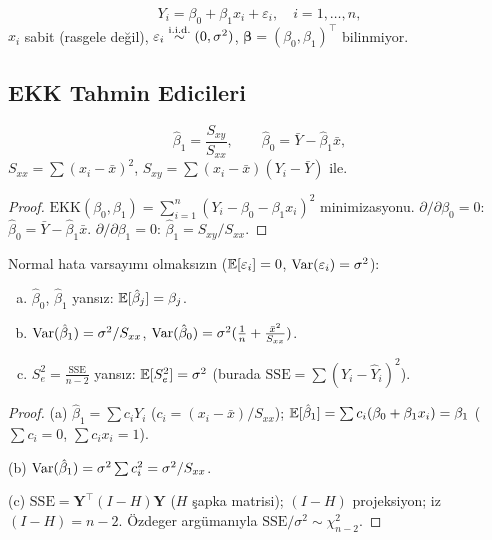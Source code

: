 \begin{tanim}\label{def:bdr_model}
\[
  Y_i = \beta_0 + \beta_1 x_i + \varepsilon_i, \quad i=1,\ldots,n,
\]
$x_i$ sabit (rasgele değil), $\varepsilon_i\overset{\text{i.i.d.}}{\sim}(0,\sigma^2)$, $\boldsymbol{\beta}=(\beta_0,\beta_1)^\top$ bilinmiyor.
\end{tanim}

\subsection{EKK Tahmin Edicileri}

\begin{teorem}\label{thm:ekk_tah}
\[
  \hat\beta_1 = \frac{S_{xy}}{S_{xx}}, \qquad \hat\beta_0 = \bar{Y} - \hat\beta_1\bar{x},
\]
$S_{xx}=\sum(x_i-\bar{x})^2$, $S_{xy}=\sum(x_i-\bar{x})(Y_i-\bar{Y})$ ile.
\end{teorem}

\begin{proof}
$\mathrm{EKK}(\beta_0,\beta_1) = \sum_{i=1}^n(Y_i-\beta_0-\beta_1 x_i)^2$ minimizasyonu. $\partial/\partial\beta_0=0$: $\hat\beta_0=\bar{Y}-\hat\beta_1\bar{x}$. $\partial/\partial\beta_1=0$: $\hat\beta_1=S_{xy}/S_{xx}$.
\end{proof}

\begin{teorem}\label{thm:ekk_ozell}
Normal hata varsayımı olmaksızın ($\mathbb{E}[\varepsilon_i]=0$, $\operatorname{Var}(\varepsilon_i)=\sigma^2$):
\begin{enumerate}[(a)]
  \item $\hat\beta_0$, $\hat\beta_1$ yansız: $\mathbb{E}[\hat\beta_j]=\beta_j$.
  \item $\operatorname{Var}(\hat\beta_1)=\sigma^2/S_{xx}$, $\operatorname{Var}(\hat\beta_0)=\sigma^2(\frac{1}{n}+\frac{\bar{x}^2}{S_{xx}})$.
  \item $S^2_e = \frac{\mathrm{SSE}}{n-2}$ yansız: $\mathbb{E}[S^2_e]=\sigma^2$ (burada $\mathrm{SSE}=\sum(Y_i-\hat{Y}_i)^2$).
\end{enumerate}
\end{teorem}

\begin{proof}
(a) $\hat\beta_1 = \sum c_i Y_i$ ($c_i=(x_i-\bar{x})/S_{xx}$); $\mathbb{E}[\hat\beta_1]=\sum c_i(\beta_0+\beta_1 x_i)=\beta_1$ ($\sum c_i=0$, $\sum c_i x_i=1$).

(b) $\operatorname{Var}(\hat\beta_1)=\sigma^2\sum c_i^2=\sigma^2/S_{xx}$.

(c) $\mathrm{SSE}=\mathbf{Y}^\top(I-H)\mathbf{Y}$ ($H$ şapka matrisi); $(I-H)$ projeksiyon; iz$(I-H)=n-2$. Özdeger argümanıyla $\mathrm{SSE}/\sigma^2\sim\chi^2_{n-2}$.
\end{proof}

